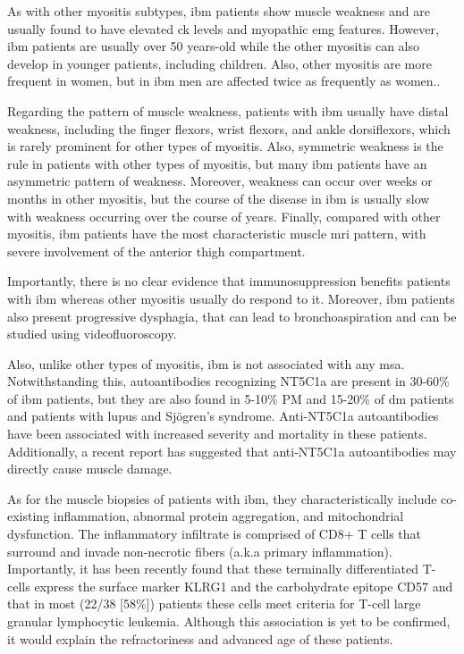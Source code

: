 As with other myositis subtypes, \gls{ibm} patients show muscle weakness and are usually found to have elevated \gls{ck} levels and myopathic \gls{emg} features. However, \gls{ibm} patients are usually over 50 years-old while the other myositis can also develop in younger patients, including children.\cite{SelvaOCallaghan2018} Also, other myositis are more frequent in women, but in \gls{ibm} men are affected twice as frequently as women.\cite{SelvaOCallaghan2018}.

Regarding the pattern of muscle weakness, patients with \gls{ibm} usually have distal weakness, including the finger flexors, wrist flexors, and ankle dorsiflexors, which is rarely prominent for other types of myositis.\cite{Lloyd2014,SelvaOCallaghan2018} Also, symmetric weakness is the rule in patients with other types of myositis, but many \gls{ibm} patients have an asymmetric pattern of weakness.\cite{SelvaOCallaghan2018} Moreover, weakness can occur over weeks or months in other myositis, but the course of the disease in \gls{ibm} is usually slow with weakness occurring over the course of years.\cite{SelvaOCallaghan2018} Finally, compared with other myositis, \gls{ibm} patients have the most characteristic muscle \gls{mri} pattern, with severe involvement of the anterior thigh compartment.\cite{Tasca2015,PinalFernandez2017}

Importantly, there is no clear evidence that immunosuppression benefits patients with \gls{ibm} whereas other myositis usually do respond to it.\cite{SelvaOCallaghan2018} Moreover, \gls{ibm} patients also present progressive dysphagia,\cite{SelvaOCallaghan2018} that can lead to bronchoaspiration and can be studied using videofluoroscopy. 

Also, unlike other types of myositis, \gls{ibm} is not associated with any \gls{msa}. Notwithstanding this, autoantibodies recognizing NT5C1a are present in 30-60\% of \gls{ibm} patients, but they are also found in 5-10\% PM and 15-20\% of \gls{dm} patients and patients with lupus and Sjögren's syndrome.\cite{Lloyd2016,Herbert2016,Muro2017,Lilleker2017} Anti-NT5C1a autoantibodies have been associated with increased severity and mortality in these patients.\cite{Lilleker2017,Goyal2016} Additionally, a recent report has suggested that anti-NT5C1a autoantibodies may directly cause muscle damage.\cite{Tawara2017}

As for the muscle biopsies of patients with \gls{ibm}, they characteristically include co-existing inflammation, abnormal protein aggregation, and mitochondrial dysfunction.\cite{Dalakas2002} The inflammatory infiltrate is comprised of CD8+ T cells that surround and invade non-necrotic fibers (a.k.a primary inflammation). Importantly, it has been recently found that these terminally differentiated T-cells express the surface marker KLRG1 and the carbohydrate epitope CD57 and that in most (22/38 [58\%]) patients these cells meet criteria for T-cell large granular lymphocytic leukemia.\cite{Greenberg2016,Greenberg2019} Although this association is yet to be confirmed, it would explain the refractoriness and advanced age of these patients.\cite{Greenberg2016,Greenberg2019,Greenberg2019a}

